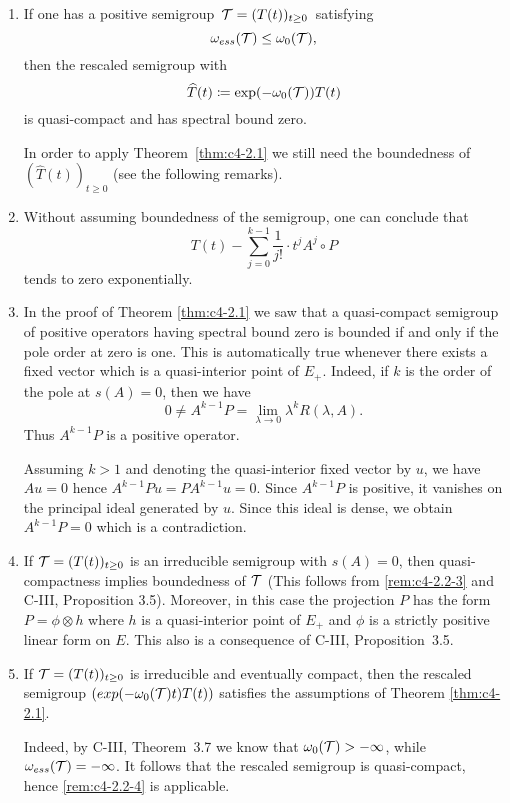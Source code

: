 \begin{remarks}\label{rem:c4-2.2}
\begin{enumerate}[\upshape (i), wide, labelindent=.5em]

\item \label{rem:c4-2.2-1}
If one has a positive semigroup\, $\mathcal{T} = (T(t))_{t \geq 0}$\,  satisfying
\[
\omega_{ess}(\mathcal{T}) \leq  \omega_0(\mathcal{T}), 
\]
then the rescaled semigroup with 
\[
\widehat{T}(t) \coloneqq \exp(-\omega_0(\mathcal{T}))T(t)
\]
is quasi-compact and has spectral bound zero.

In order to apply Theorem~\ref{thm:c4-2.1} we still need the boundedness of $(\widehat{T}(t))_{t\geq 0}$ (see the following remarks).

\item \label{rem:c4-2.2-2}
Without assuming boundedness of the semigroup, one can conclude that
\[
T(t) - \sum_{j=0}^{k-1} \frac{1}{j!} \cdot t^{j}A^{j}{\circ}P
\]
tends to zero exponentially.

\item \label{rem:c4-2.2-3}
In the proof of Theorem \ref{thm:c4-2.1} we saw that a quasi-compact semigroup of positive operators having spectral bound zero is bounded if and only if the pole order at zero is one.
This is automatically true whenever there exists a fixed vector which is a quasi-interior point of $E_{+}$.
Indeed, if $k$ is the order of the pole at $s(A) = 0$, then we have 
\[
0 \neq A^{k-1}P = \lim_{\lambda \to 0} \lambda^{k}R(\lambda,A).
\]
Thus $A^{k-1}P$ is a positive operator.

Assuming $k > 1$ and denoting the quasi-interior fixed vector by $u$, we have $Au = 0$ hence $A^{k-1}Pu = PA^{k-1}u = 0$.
Since $A^{k-1}P$ is positive, it vanishes on the principal ideal generated by $u$.
Since this ideal is dense, we obtain $A^{k-1}P = 0$ which is a contradiction.

\item  \label{rem:c4-2.2-4}
If $\mathcal{T} = (T(t))_{t \geq 0}$ is an irreducible semigroup with $s(A) = 0$, then quasi-compactness implies boundedness of $\mathcal{T}$ (This follows from \ref{rem:c4-2.2-3} and C-III, Proposition 3.5).
Moreover, in this case the projection $P$ has the form $P = \phi \otimes h$ where $h$ 
is a quasi-interior point of $E_{+}$ and $\phi$ is a strictly positive linear form on $E$.
This also is a consequence of C-III, Proposition~3.5.

\item  \label{rem:c4-2.2-5}
If $\mathcal{T} = (T(t))_{t \geq 0}$ is irreducible and eventually compact, then the rescaled semigroup $(exp(-\omega_0(\mathcal{T})t)T(t))$ satisfies the assumptions of Theorem \ref{thm:c4-2.1}.

Indeed, by C-III, Theorem~3.7 we know that $\omega_0(\mathcal{T}) > -\infty$, while $\omega_{ess}(\mathcal{T}) = -\infty$.
It follows that the rescaled semigroup is quasi-compact, hence \ref{rem:c4-2.2-4} is applicable.
\end{enumerate}
\end{remarks}

